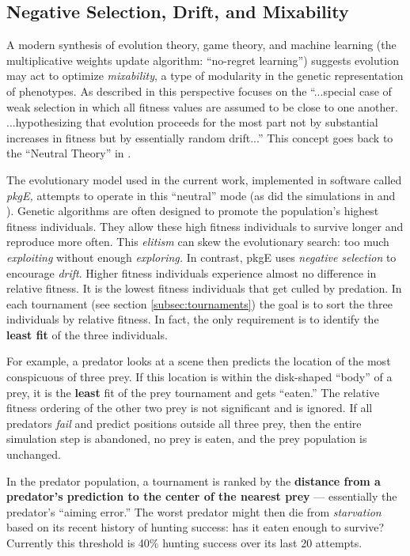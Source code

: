 \documentclass[acmtog,
    anonymous,
    review
    ]{acmart}
\newcommand{\jargon}[1]{\textit{#1}}
\newcommand{\lazypredator}[0]{pkgE}
\begin{document}
\subsection{Negative Selection, Drift, and Mixability}

A modern synthesis \cite{livnat_sex_2016} of evolution theory, game theory, and machine learning (the multiplicative weights update algorithm: “no-regret learning”) suggests evolution may act to optimize \jargon{mixability}, a type of modularity in the genetic representation of phenotypes. As described in \citet{chastain_multiplicative_2013} this perspective focuses on the “...special case of weak selection in which all fitness values are assumed to be close to one another. ...hypothesizing that evolution proceeds for the most part not by substantial increases in fitness but by essentially random drift...” This concept goes back to the “Neutral Theory” in \citet{kimura_evolutionary_1968}.
\par
The evolutionary model used in the current work, implemented in software called \jargon{\lazypredator{},} attempts to operate in this “neutral” mode (as did the simulations in \citet{reynolds_iec_2011} and \citet{harrington_coevolution_2014}). Genetic algorithms are often designed to promote the population's highest fitness individuals. They allow these high fitness individuals to survive longer and reproduce more often. This \jargon{elitism} can skew the evolutionary search: too much \jargon{exploiting} without enough \jargon{exploring.}  In contrast, \lazypredator{} uses \textit{negative selection} to encourage \jargon{drift}. Higher fitness individuals experience almost no difference in  relative fitness. It is the lowest fitness individuals that get culled by predation. In each tournament (see section \ref{subsec:tournaments}) the goal is to sort the three individuals by relative fitness. In fact, the only requirement is to identify the \textbf{least fit} of the three individuals.
\par 
For example, a predator looks at a scene then predicts the location of the most conspicuous of three prey. If this location is within the disk-shaped “body” of a prey, it is the \textbf{least} fit of the prey tournament and gets “eaten.” The relative fitness ordering of the other two prey is not significant and is ignored. If all predators \jargon{fail} and predict positions outside all three prey, then the entire simulation step is abandoned, no prey is eaten, and the prey population is unchanged.
\par
In the predator population, a tournament is ranked by the \textbf{distance from a predator's prediction to the center of the nearest prey} — essentially the predator's “aiming error.” The worst predator might then die from \jargon{starvation} based on its recent history of hunting success: has it eaten enough to survive? Currently this threshold is 40\% hunting success over its last 20 attempts.
\end{document}
